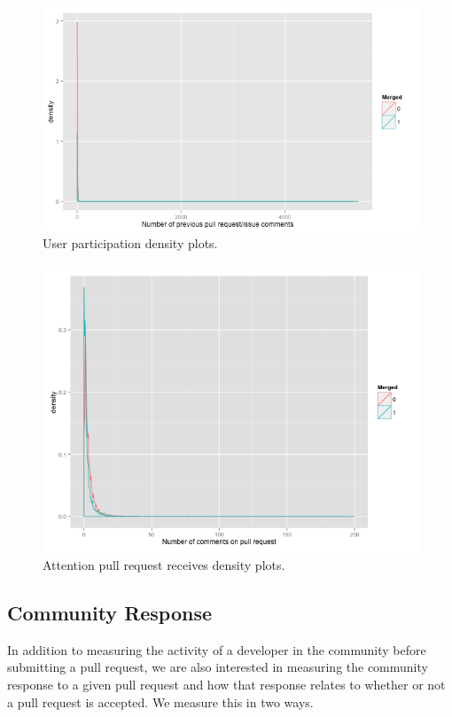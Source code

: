 \documentclass{sigchi}
\begin{document}
\begin{figure}[p] \centering
\includegraphics[scale=0.6]{figures/number_comments_density_ggplot.png}
\caption{User participation density plots.}  \label{fig:up}
\end{figure}

\begin{figure}[p] \centering
\includegraphics[scale=0.6]{figures/comments_on_pr_density_ggplot.png}
\caption{Attention pull request receives density plots.}  \label{fig:aprr}
\end{figure}

\subsection{Community Response}
In addition to measuring the activity of a developer in the community before
submitting a pull request, we are also interested in measuring the community
response to a given pull request and how that response relates to whether or not
a pull request is accepted. We measure this in two ways.
\end{document}
